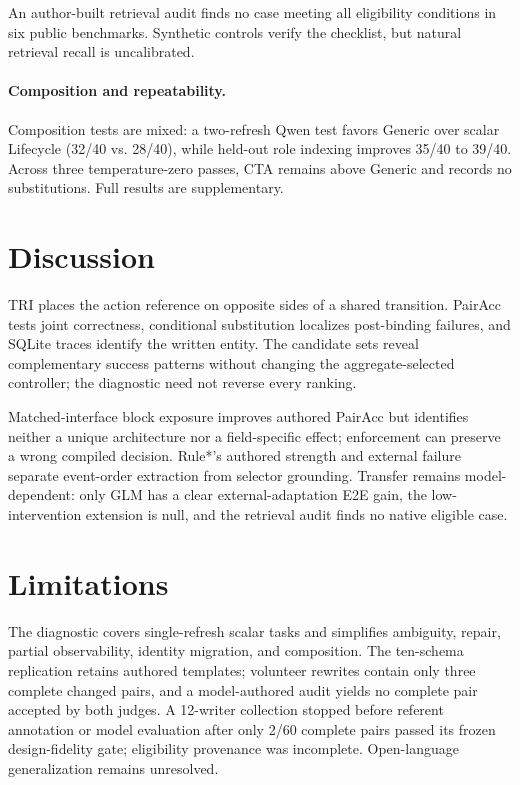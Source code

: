 \documentclass[letterpaper]{article}
\begin{document}
An author-built retrieval audit finds no case meeting all eligibility conditions in six public
benchmarks. Synthetic controls verify the checklist, but natural retrieval recall is uncalibrated.

\paragraph{Composition and repeatability.}
Composition tests are mixed: a two-refresh Qwen test favors Generic over scalar Lifecycle (32/40
vs. 28/40), while held-out role indexing improves 35/40 to 39/40. Across three temperature-zero
passes, CTA remains above Generic and records no substitutions. Full results are supplementary.

\section{Discussion}

TRI places the action reference on opposite sides of a shared transition. PairAcc tests joint
correctness, conditional substitution localizes post-binding failures, and SQLite traces identify
the written entity. The candidate sets reveal complementary success patterns without changing the
aggregate-selected controller; the diagnostic need not reverse every ranking.

Matched-interface block exposure improves authored PairAcc but identifies neither a unique
architecture nor a field-specific effect; enforcement can preserve a wrong compiled decision.
Rule*'s authored strength and external failure separate event-order extraction from selector
grounding. Transfer remains model-dependent: only GLM has a clear external-adaptation E2E gain,
the low-intervention extension is null, and the retrieval audit finds no native eligible case.

\section{Limitations}

The diagnostic covers single-refresh scalar tasks and simplifies ambiguity, repair, partial
observability, identity migration, and composition. The ten-schema replication retains authored
templates; volunteer rewrites contain only three complete changed pairs, and a model-authored audit
yields no complete pair accepted by both judges. A 12-writer collection stopped before referent
annotation or model evaluation after only 2/60 complete pairs passed its frozen design-fidelity
gate; eligibility provenance was incomplete. Open-language generalization remains unresolved.
\end{document}
